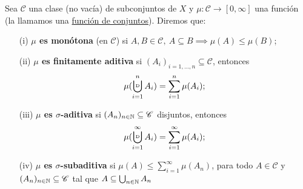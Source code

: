 \begin{definition}
	Sea $\mathscr{C}$ una clase (no vacía) de subconjuntos de $X$ y $\mu : \mathscr{C} \to [0,\infty]$ una función (la llamamos una \underline{función de conjuntos}). Diremos que:
	\begin{enumerate}
		\item[(i)] \textbf{$\mu$ es monótona} (en $\mathscr{C}$) si $A,B\in\mathscr{C},\ A \subseteq B \implies \mu(A)\leq\mu(B)$;

		\item[(ii)] \textbf{$\mu$ es finitamente aditiva} si $(A_i)_{i=1,\dots,n} \subseteq \mathscr{C}$, entonces
		\[ \mu(\bigcupd_{i=1}^{n} A_i) = \sum_{i=1}^{n} \mu(A_i); \]

		\item[(iii)] \textbf{$\mu$ es $\sigma$-aditiva} si $(A_n)_{n\in\mathbb{N}} \subseteq \mathscr{C}$ disjuntos, entonces
		\[ \mu (\bigcupd_{i=1}^{\infty} A_i ) = \sum_{i=1}^{\infty} \mu(A_i); \]

		\item[(iv)] \textbf{$\mu$ es $\sigma$-subaditiva} si $\mu(A)\leq \sum_{i=1}^{\infty}\mu(A_n)$, para todo $A \in \mathscr{C}$ y $(A_n)_{n\in\mathbb{N}}\subseteq\mathscr{C}$ tal que $A \subseteq \bigcup_{n\in\mathbb{N}} A_n$
	\end{enumerate}
\end{definition}
